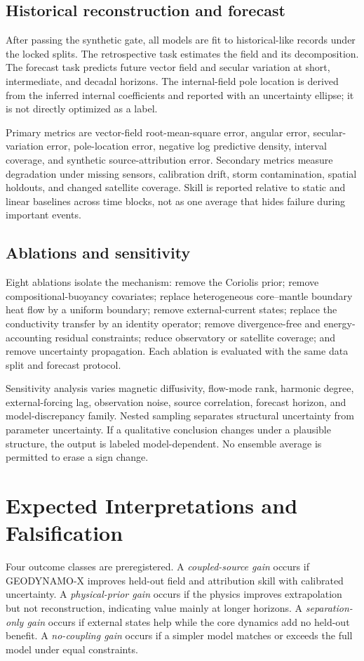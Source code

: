 \documentclass[conference]{IEEEtran}
\begin{document}
\subsection{Historical reconstruction and forecast}
After passing the synthetic gate, all models are fit to historical-like records under the locked splits. The retrospective task estimates the field and its decomposition. The forecast task predicts future vector field and secular variation at short, intermediate, and decadal horizons. The internal-field pole location is derived from the inferred internal coefficients and reported with an uncertainty ellipse; it is not directly optimized as a label.

Primary metrics are vector-field root-mean-square error, angular error, secular-variation error, pole-location error, negative log predictive density, interval coverage, and synthetic source-attribution error. Secondary metrics measure degradation under missing sensors, calibration drift, storm contamination, spatial holdouts, and changed satellite coverage. Skill is reported relative to static and linear baselines across time blocks, not as one average that hides failure during important events.

\subsection{Ablations and sensitivity}
Eight ablations isolate the mechanism: remove the Coriolis prior; remove compositional-buoyancy covariates; replace heterogeneous core--mantle boundary heat flow by a uniform boundary; remove external-current states; replace the conductivity transfer by an identity operator; remove divergence-free and energy-accounting residual constraints; reduce observatory or satellite coverage; and remove uncertainty propagation. Each ablation is evaluated with the same data split and forecast protocol.

Sensitivity analysis varies magnetic diffusivity, flow-mode rank, harmonic degree, external-forcing lag, observation noise, source correlation, forecast horizon, and model-discrepancy family. Nested sampling separates structural uncertainty from parameter uncertainty. If a qualitative conclusion changes under a plausible structure, the output is labeled model-dependent. No ensemble average is permitted to erase a sign change.

\section{Expected Interpretations and Falsification}
Four outcome classes are preregistered. A \textit{coupled-source gain} occurs if GEODYNAMO-X improves held-out field and attribution skill with calibrated uncertainty. A \textit{physical-prior gain} occurs if the physics improves extrapolation but not reconstruction, indicating value mainly at longer horizons. A \textit{separation-only gain} occurs if external states help while the core dynamics add no held-out benefit. A \textit{no-coupling gain} occurs if a simpler model matches or exceeds the full model under equal constraints.
\end{document}
